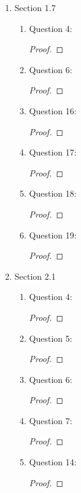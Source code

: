 \documentclass{article}
\begin{document}
\begin{enumerate}
\begin{enumerate}
      \item Question 16:
        \begin{proof}
        \end{proof}
    \end{enumerate}

  \item Section 1.7
    \begin{enumerate}
      \item Question 4:
        \begin{proof}
        \end{proof}

      \item Question 6:
        \begin{proof}
        \end{proof}

      \item Question 16:
        \begin{proof}
        \end{proof}

      \item Question 17:
        \begin{proof}
        \end{proof}

      \item Question 18:
        \begin{proof}
        \end{proof}

      \item Question 19:
        \begin{proof}
        \end{proof}
    \end{enumerate}

  \item Section 2.1
    \begin{enumerate}
      \item Question 4:
        \begin{proof}
        \end{proof}

      \item Question 5:
        \begin{proof}
        \end{proof}

      \item Question 6:
        \begin{proof}
        \end{proof}

      \item Question 7:
        \begin{proof}
        \end{proof}

      \item Question 14:
        \begin{proof}
        \end{proof}
    \end{enumerate}
\end{enumerate}
\end{document}

